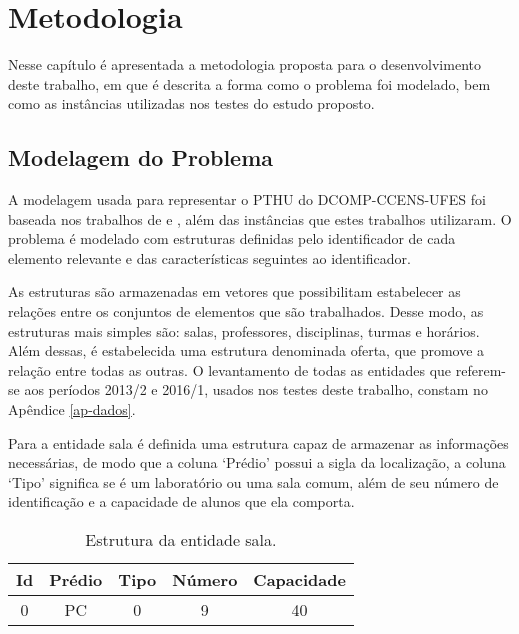 \chapter{Metodologia}
\label{sec-metodologia}
Nesse capítulo é apresentada a metodologia proposta para o desenvolvimento deste trabalho, em que é descrita a forma como o problema foi modelado, bem como as instâncias utilizadas nos testes do estudo proposto. 

\section{Modelagem do Problema}
\label{sec-met-modelagem}
A modelagem usada para representar o PTHU do DCOMP-CCENS-UFES foi baseada nos trabalhos de  e , além das instâncias que estes trabalhos utilizaram. O problema é modelado com estruturas definidas pelo identificador de cada elemento relevante e das características seguintes ao identificador.

As estruturas são armazenadas em vetores que possibilitam estabelecer as relações entre os conjuntos de elementos que são trabalhados. Desse modo, as estruturas mais simples são: salas, professores, disciplinas, turmas e horários. Além dessas, é estabelecida uma estrutura denominada oferta, que promove a relação entre todas as outras. O levantamento de todas as entidades que referem-se aos períodos 2013/2 e 2016/1, usados nos testes deste trabalho, constam no Apêndice \ref{ap-dados}.

Para a entidade sala é definida uma estrutura capaz de armazenar as informações necessárias, de modo que a coluna ‘Prédio’ possui a sigla da localização, a coluna ‘Tipo’ significa se é um laboratório ou uma sala comum, além de seu número de identificação e a capacidade de alunos que ela comporta.


\begin{table}[h!]
\centering
\begin{tabular}{ | c | c | c | c | c |}\hline
\textbf{Id} & \textbf{Prédio} & \textbf{Tipo} & \textbf{Número} & \textbf{Capacidade}\\\hline
0 & PC & 0 & 9 & 40\\\hline
\end{tabular}
\caption{Estrutura da entidade sala.}
\label{tbl-met-sala}
\end{table}

